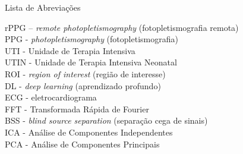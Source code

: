 \begin{pretextualsection}{Lista de Abreviações}

\noindent
rPPG – \textit{remote photopletismography} (fotopletismografia remota)\\
PPG - \textit{photopletismography} (fotopletismografia) \\
UTI - Unidade de Terapia Intensiva \\
UTIN - Unidade de Terapia Intensiva Neonatal \\
ROI - \textit{region of interest} (região de interesse) \\
DL - \textit{deep learning} (aprendizado profundo) \\
ECG - eletrocardiograma \\
FFT - Transformada Rápida de Fourier \\
BSS - \textit{blind source separation} (separação cega de sinais) \\
ICA - Análise de Componentes Independentes \\
PCA - Análise de Componentes Principais \\

\end{pretextualsection}